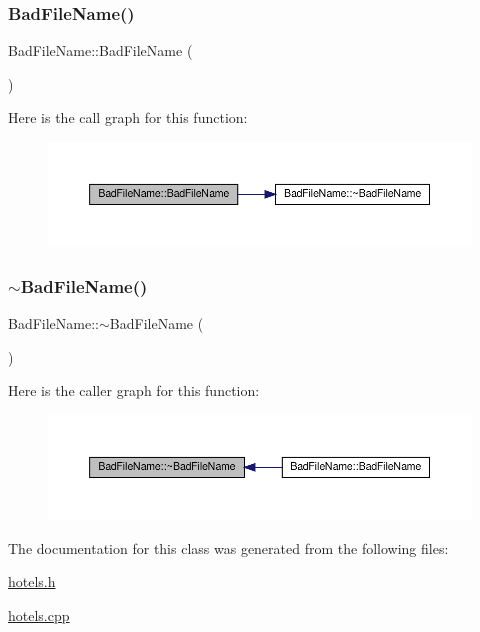 \subsubsection{\texorpdfstring{Bad\+File\+Name()}{BadFileName()}}
{\footnotesize\ttfamily Bad\+File\+Name\+::\+Bad\+File\+Name (\begin{DoxyParamCaption}{ }\end{DoxyParamCaption})\hspace{0.3cm}{\ttfamily [inline]}}

Here is the call graph for this function\+:\nopagebreak
\begin{figure}[H]
\begin{center}
\leavevmode
\includegraphics[width=350pt]{class_bad_file_name_adc47fdc3b0868830a1062fbc080fd735_cgraph}
\end{center}
\end{figure}
\mbox{\label{class_bad_file_name_a4ac0074ff0e544a3ffc6a18c8bdc1273}} 
\subsubsection{\texorpdfstring{$\sim$\+Bad\+File\+Name()}{~BadFileName()}}
{\footnotesize\ttfamily Bad\+File\+Name\+::$\sim$\+Bad\+File\+Name (\begin{DoxyParamCaption}{ }\end{DoxyParamCaption})\hspace{0.3cm}{\ttfamily [virtual]}}

Here is the caller graph for this function\+:\nopagebreak
\begin{figure}[H]
\begin{center}
\leavevmode
\includegraphics[width=350pt]{class_bad_file_name_a4ac0074ff0e544a3ffc6a18c8bdc1273_icgraph}
\end{center}
\end{figure}


The documentation for this class was generated from the following files\+:\begin{DoxyCompactItemize}
\item 
\hyperlink{hotels_8h}{hotels.\+h}\item 
\hyperlink{hotels_8cpp}{hotels.\+cpp}\end{DoxyCompactItemize}
